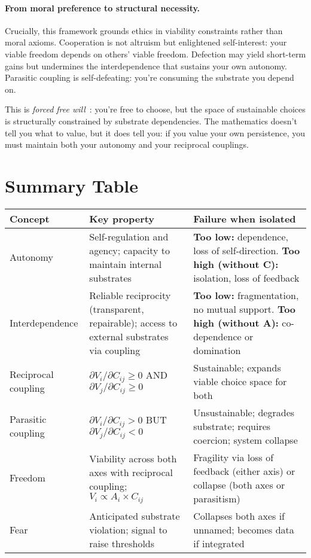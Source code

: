 \documentclass[11pt,a4paper]{article}
\begin{document}
\paragraph{From moral preference to structural necessity.}
Crucially, this framework grounds ethics in viability constraints rather than moral axioms. Cooperation is not altruism but enlightened self-interest: your viable freedom depends on others' viable freedom. Defection may yield short-term gains but undermines the interdependence that sustains your own autonomy. Parasitic coupling is self-defeating: you're consuming the substrate you depend on.

This is \emph{forced free will}~\cite{ebe}: you're free to choose, but the space of sustainable choices is structurally constrained by substrate dependencies. The mathematics doesn't tell you what to value, but it does tell you: if you value your own persistence, you must maintain both your autonomy and your reciprocal couplings.

\section{Summary Table}

\begin{center}
\small
\begin{tabular}{|l|p{5cm}|p{6cm}|}
\hline
\textbf{Concept} & \textbf{Key property} & \textbf{Failure when isolated} \\ \hline
Autonomy & Self-regulation and agency; capacity to maintain internal substrates & \textbf{Too low:} dependence, loss of self-direction. \textbf{Too high (without C):} isolation, loss of feedback \\ \hline
Interdependence & Reliable reciprocity (transparent, repairable); access to external substrates via coupling & \textbf{Too low:} fragmentation, no mutual support. \textbf{Too high (without A):} co-dependence or domination \\ \hline
Reciprocal coupling & $\partial V_i/\partial C_{ij} \geq 0$ AND $\partial V_j/\partial C_{ij} \geq 0$ & Sustainable; expands viable choice space for both \\ \hline
Parasitic coupling & $\partial V_i/\partial C_{ij} > 0$ BUT $\partial V_j/\partial C_{ij} < 0$ & Unsustainable; degrades substrate; requires coercion; system collapse \\ \hline
Freedom & Viability across both axes with reciprocal coupling; $V_i \propto A_i \times C_{ij}$ & Fragility via loss of feedback (either axis) or collapse (both axes or parasitism) \\ \hline
Fear & Anticipated substrate violation; signal to raise thresholds & Collapses both axes if unnamed; becomes data if integrated \\ \hline
\end{tabular}
\end{center}
\end{document}
